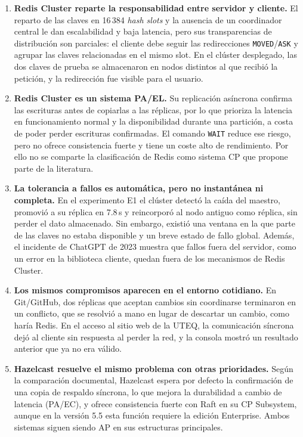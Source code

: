 \documentclass[11pt,a4paper]{article}
\begin{document}
\begin{enumerate}
  \item \textbf{Redis Cluster reparte la responsabilidad entre servidor y
  cliente.} El reparto de las claves en 16\,384 \emph{hash slots} y la
  ausencia de un coordinador central le dan escalabilidad y baja latencia,
  pero sus transparencias de distribución son parciales: el cliente debe
  seguir las redirecciones \texttt{MOVED}/\texttt{ASK} y agrupar las claves
  relacionadas en el mismo slot. En el clúster desplegado, las dos claves de
  prueba se almacenaron en nodos distintos al que recibió la petición, y la
  redirección fue visible para el usuario.

  \item \textbf{Redis Cluster es un sistema PA/EL.} Su replicación asíncrona
  confirma las escrituras antes de copiarlas a las réplicas, por lo que
  prioriza la latencia en funcionamiento normal y la disponibilidad durante
  una partición, a costa de poder perder escrituras confirmadas. El comando
  \texttt{WAIT} reduce ese riesgo, pero no ofrece consistencia fuerte y tiene
  un coste alto de rendimiento. Por ello no se comparte la clasificación de
  Redis como sistema CP que propone parte de la literatura.

  \item \textbf{La tolerancia a fallos es automática, pero no instantánea ni
  completa.} En el experimento E1 el clúster detectó la caída del maestro,
  promovió a su réplica en 7.8\,s y reincorporó al nodo antiguo como réplica,
  sin perder el dato almacenado. Sin embargo, existió una ventana en la que
  parte de las claves no estaba disponible y un breve estado de fallo
  global. Además, el incidente de ChatGPT de 2023 muestra que fallos fuera
  del servidor, como un error en la biblioteca cliente, quedan fuera de los
  mecanismos de Redis Cluster.

  \item \textbf{Los mismos compromisos aparecen en el entorno cotidiano.}
  En Git/GitHub, dos réplicas que aceptan cambios sin coordinarse terminaron
  en un conflicto, que se resolvió a mano en lugar de descartar un cambio,
  como haría Redis. En el acceso al sitio web de la UTEQ, la comunicación
  síncrona dejó al cliente sin respuesta al perder la red, y la consola
  mostró un resultado anterior que ya no era válido.

  \item \textbf{Hazelcast resuelve el mismo problema con otras prioridades.}
  Según la comparación documental, Hazelcast espera por defecto la
  confirmación de una copia de respaldo síncrona, lo que mejora la
  durabilidad a cambio de latencia (PA/EC), y ofrece consistencia fuerte con
  Raft en su CP Subsystem, aunque en la versión 5.5 esta función requiere la
  edición Enterprise. Ambos sistemas siguen siendo AP en sus estructuras
  principales.


\end{enumerate}
\end{document}
